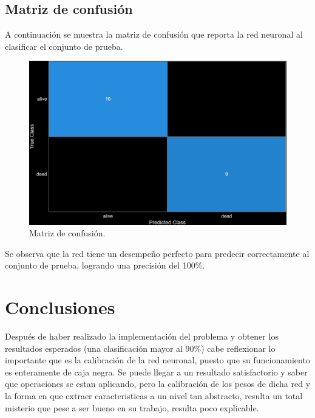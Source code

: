 \documentclass[11pt, letterpaper]{article}
\begin{document}
\newpage

\subsection{Matriz de confusión}

A continuación se muestra la matriz de confusión que reporta la red neuronal al clasificar el conjunto de prueba.

\begin{figure}[h!]
	\centering %
	\includegraphics[width=1.35\textwidth]{IMG/G2.png} %
	\caption{Matriz de confusión.}
	\label{fig:f3}
\end{figure}

Se observa que la red tiene un desempeño perfecto para predecir correctamente al conjunto de prueba, logrando una precisión del 100\%.



\newpage
	
\section{Conclusiones}

Después de haber realizado la implementación del problema y obtener los resultados esperados (una clasificación mayor al 90\%) cabe reflexionar lo importante que es la calibración de la red neuronal, puesto que su funcionamiento es enteramente de caja negra. Se puede llegar a un resultado satisfactorio y saber que operaciones se estan aplicando, pero la calibración de los pesos de dicha red y la forma en que extraer caracteristicas a un nivel tan abstracto, resulta un total misterio que pese a ser bueno en su trabajo, resulta poco explicable.	
\end{document}
